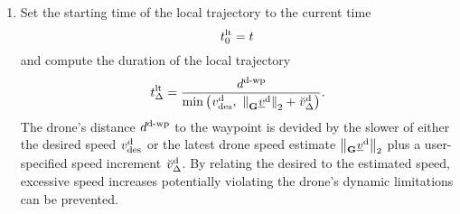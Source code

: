 \begin{enumerate}
    \item Set the starting time of the local trajectory to the current time
    \begin{equation}
        \timepnt[]{\loctraj}{0}{}{} = t
    \end{equation}
    and compute the duration of the local trajectory 
    \begin{equation}
        \dur[]{\loctraj}{}{}{}
        = 
        \frac{
            \dist[]{\dronetowayp}{}{}{}
        }{
            \minof{
            \speed[]{\drone}{\desired}{}{}
            }{
                \left\|
                    \vel[]{\drone}{}{\grs}{}
                \right\|_2
                + 
                \speed[\user]{\drone}{\Delta}{}{}
            }
        }.
    \end{equation}
    The drone's distance 
    $\dist[]{\dronetowayp}{}{}{}$
    to the waypoint is devided 
    by the slower of either the desired speed
    $\speed[]{\drone}{\desired}{}{}$
    or the latest drone speed estimate
    $\left\|\vel[]{\drone}{}{\grs}{}\right\|_2$
    plus a user-specified speed increment
    $\speed[\user]{\drone}{\Delta}{}{}$.
    By relating the desired to the estimated speed,
    excessive speed increases
    potentially violating the drone's dynamic limitations
    can be prevented.


\end{enumerate}

